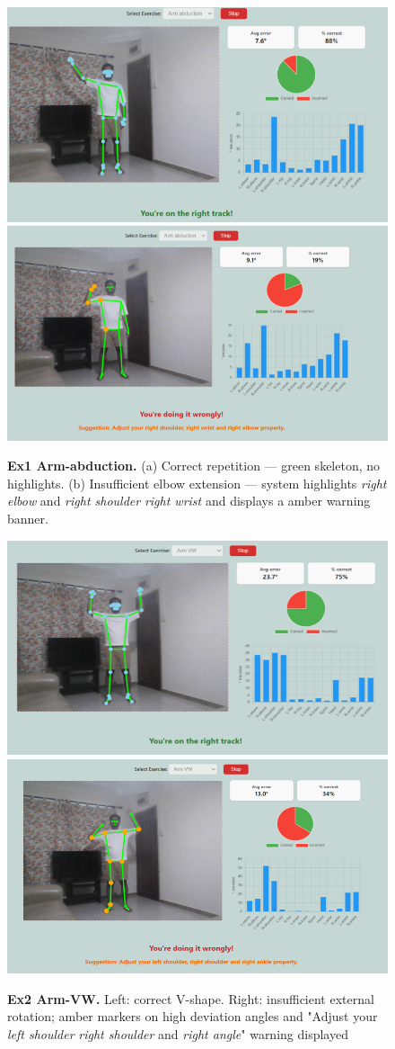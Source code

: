 \documentclass{article}
\begin{document}
\begin{figure}[H]
  \centering
  \includegraphics[width=.48\linewidth]{figs/ex1_correct.png}%
  \hfill
  \includegraphics[width=.48\linewidth]{figs/ex1_bad_form.png}
  \caption{\textbf{Ex1 Arm-abduction.}
           (a) Correct repetition — green skeleton, no highlights.
           (b) Insufficient elbow extension — system highlights
           \emph{right elbow} and \emph{right shoulder} \emph{right wrist } and displays a
           amber warning banner.}
  \label{fig:qual_ex1}
\end{figure}

\begin{figure}[H]
  \centering
  \includegraphics[width=.48\linewidth]{figs/ex2_correct.png}%
  \hfill
  \includegraphics[width=.48\linewidth]{figs/ex2_bad_form.png}
  \caption{\textbf{Ex2 Arm-VW.}
           Left: correct V-shape.  Right: insufficient external rotation;
           amber markers on high deviation angles and "Adjust your \emph{left shoulder} \emph{right shoulder} and \emph{right angle}" warning displayed}
  \label{fig:qual_ex2}
\end{figure}
\end{document}
